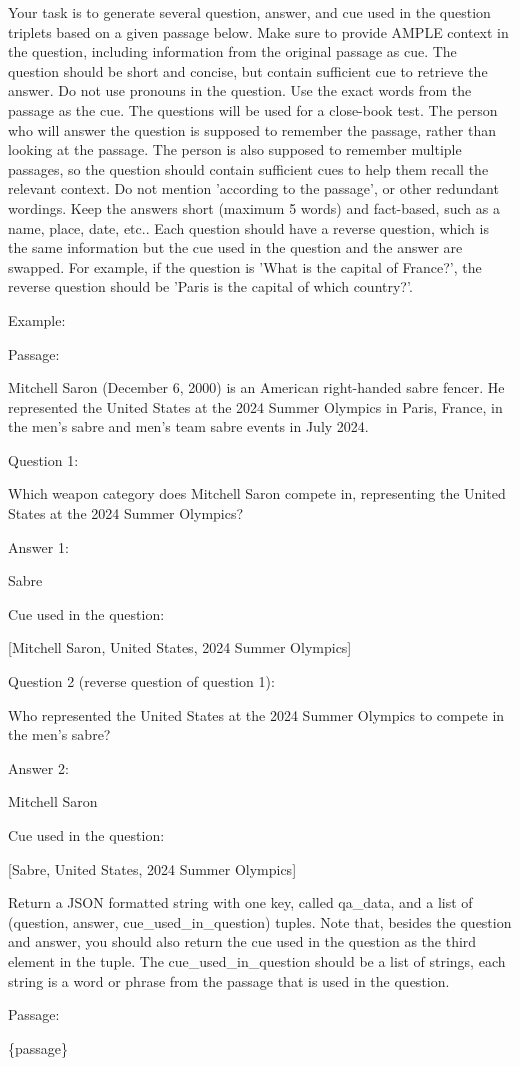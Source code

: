 \begin{tcolorbox}[colback=gray!10, colframe=gray!50, title=Prompt for generating QAs,fontupper=\small\linespread{0.8}\selectfont]
    Your task is to generate several question, answer, and cue used in the question triplets based on a given passage below. Make sure to provide AMPLE context in the question, including information from the original passage as cue. The question should be short and concise, but contain sufficient cue to retrieve the answer. Do not use pronouns in the question. Use the exact words from the passage as the cue. The questions will be used for a close-book test. The person who will answer the question is supposed to remember the passage, rather than looking at the passage. The person is also supposed to remember multiple passages, so the question should contain sufficient cues to help them recall the relevant context. Do not mention 'according to the passage', or other redundant wordings. Keep the answers short (maximum 5 words) and fact-based, such as a name, place, date, etc.. Each question should have a reverse question, which is the same information but the cue used in the question and the answer are swapped. For example, if the question is 'What is the capital of France?', the reverse question should be 'Paris is the capital of which country?'.

Example:

Passage: 

Mitchell Saron (December 6, 2000) is an American right-handed sabre fencer. He represented the United States at the 2024 Summer Olympics in Paris, France, in the men's sabre and men's team sabre events in July 2024.

Question 1: 

Which weapon category does Mitchell Saron compete in, representing the United States at the 2024 Summer Olympics?

Answer 1:

Sabre

Cue used in the question:

[Mitchell Saron, United States, 2024 Summer Olympics]

Question 2 (reverse question of question 1):

Who represented the United States at the 2024 Summer Olympics to compete in the men's sabre?

Answer 2: 

Mitchell Saron

Cue used in the question:

[Sabre, United States, 2024 Summer Olympics]


Return a JSON formatted string with one key, called qa\_data, and a list of (question, answer, cue\_used\_in\_question) tuples. Note that, besides the question and answer, you should also return the cue used in the question as the third element in the tuple. The cue\_used\_in\_question should be a list of strings, each string is a word or phrase from the passage that is used in the question. 

Passage:

\{passage\}
\end{tcolorbox}

